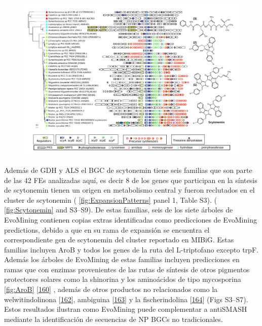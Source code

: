 \documentclass[12pt,twoside]{reedthesis}
\begin{document}
  \begin{figure}[h!tbp]
  \centering
  \includegraphics[angle = 90,scale = .8]{chapter2/FigurasPaper/Figure7.pdf}
  \caption[EvoMining Algorithm]{\footnotesize{}}
  \label{fig:CorasonScytonemina}
  \end{figure}
  
  Además de GDH y ALS el BGC de scytonemin tiene seis familias que son
  parte de las 42 FEs analizadas aquí, es decir 8 de los genes que
  participan en la síntesis de scytonemin tienen un origen en metabolismo
  central y fueron reclutados en el cluster de scytonemin (
  \autoref{fig:ExpansionPatterns} panel 1, Table S3). (
  \autoref{fig:Scytonemin} and S3--S9). De estas familias, seis de los
  siete árboles de EvoMining contienen copias extras identificadas como
  predicciones de EvoMining predictions, debido a que en su rama de
  expansión se encuentra el correspondiente gen de scytonemin del cluster
  reportado en MIBiG. Estas familias incluyen AroB y todos los genes de la
  ruta del L-triptofano excepto trpF. Además los árboles de EvoMining de
  estas familias incluyen predicciones en ramas que con enzimas
  provenientes de las rutas de síntesis de otros pigmentos protectores
  solares como la shinorina y los aminoácidos de tipo mycosporina
  \autoref{fig:AroB}
  {[}\protect\hyperlink{ref-balskus_genetic_2010}{160}{]} , además de
  otros productos no relacionados como la welwitindolinona
  {[}\protect\hyperlink{ref-hillwig_identification_2014}{162}{]},
  ambiguina
  {[}\protect\hyperlink{ref-li_hapalindole_ambiguine_2015}{163}{]} y la
  fischerindolina {[}\protect\hyperlink{ref-li_decoding_2017}{164}{]}
  (Figs S3--S7). Estos resultados ilustran como EvoMining puede
  complementar a antiSMASH mediante la identificación de secuencias de NP
  BGCs no tradicionales.
  
\end{document}
